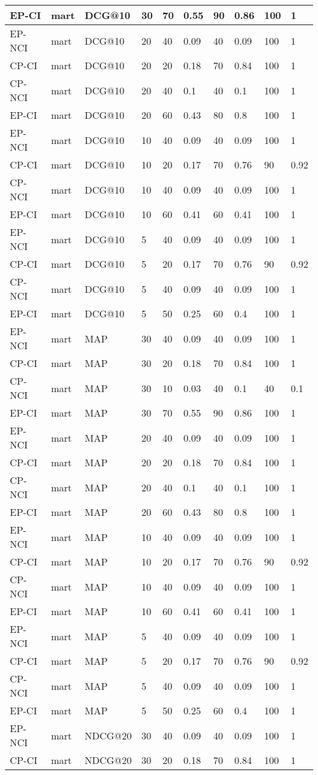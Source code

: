 \begin{landscape}
\begin{longtable}{|*{10}{l|}}
EP-CI&mart&DCG@10&30&70&0.55&90&0.86&100&1\\
\hline
EP-NCI&mart&DCG@10&20&40&0.09&40&0.09&100&1\\
CP-CI&mart&DCG@10&20&20&0.18&70&0.84&100&1\\
CP-NCI&mart&DCG@10&20&40&0.1&40&0.1&100&1\\
EP-CI&mart&DCG@10&20&60&0.43&80&0.8&100&1\\
\hline
EP-NCI&mart&DCG@10&10&40&0.09&40&0.09&100&1\\
CP-CI&mart&DCG@10&10&20&0.17&70&0.76&90&0.92\\
CP-NCI&mart&DCG@10&10&40&0.09&40&0.09&100&1\\
EP-CI&mart&DCG@10&10&60&0.41&60&0.41&100&1\\
\hline
EP-NCI&mart&DCG@10&5&40&0.09&40&0.09&100&1\\
CP-CI&mart&DCG@10&5&20&0.17&70&0.76&90&0.92\\
CP-NCI&mart&DCG@10&5&40&0.09&40&0.09&100&1\\
EP-CI&mart&DCG@10&5&50&0.25&60&0.4&100&1\\
\hline
EP-NCI&mart&MAP&30&40&0.09&40&0.09&100&1\\
CP-CI&mart&MAP&30&20&0.18&70&0.84&100&1\\
CP-NCI&mart&MAP&30&10&0.03&40&0.1&40&0.1\\
EP-CI&mart&MAP&30&70&0.55&90&0.86&100&1\\
\hline
EP-NCI&mart&MAP&20&40&0.09&40&0.09&100&1\\
CP-CI&mart&MAP&20&20&0.18&70&0.84&100&1\\
CP-NCI&mart&MAP&20&40&0.1&40&0.1&100&1\\
EP-CI&mart&MAP&20&60&0.43&80&0.8&100&1\\
\hline
EP-NCI&mart&MAP&10&40&0.09&40&0.09&100&1\\
CP-CI&mart&MAP&10&20&0.17&70&0.76&90&0.92\\
CP-NCI&mart&MAP&10&40&0.09&40&0.09&100&1\\
EP-CI&mart&MAP&10&60&0.41&60&0.41&100&1\\
\hline
EP-NCI&mart&MAP&5&40&0.09&40&0.09&100&1\\
CP-CI&mart&MAP&5&20&0.17&70&0.76&90&0.92\\
CP-NCI&mart&MAP&5&40&0.09&40&0.09&100&1\\
EP-CI&mart&MAP&5&50&0.25&60&0.4&100&1\\
\hline
EP-NCI&mart&NDCG@20&30&40&0.09&40&0.09&100&1\\
CP-CI&mart&NDCG@20&30&20&0.18&70&0.84&100&1\\

\end{longtable}
\end{landscape}
